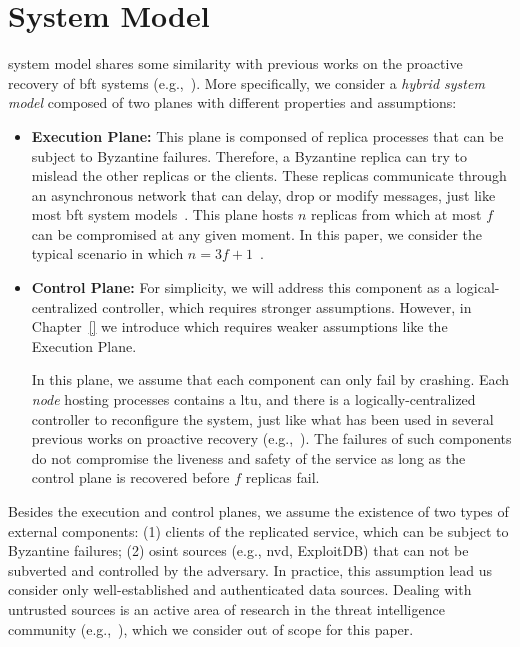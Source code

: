 \section{System Model}
\label{sec:systemmodel}

\system system model shares some similarity with previous works on the proactive recovery of \gls{bft} systems (e.g.,~\cite{Castro:2002,Platania:2014,Sousa:2010,Roeder:2010}).
More specifically, we consider a \emph{hybrid system model} composed of two planes with different properties and assumptions:

\begin{itemize}

\item \textbf{Execution Plane:} 
This plane is componsed of replica processes that can be subject to Byzantine failures.
Therefore, a Byzantine replica can try to mislead the other replicas or the clients.
These replicas communicate through an asynchronous network that can delay, drop or modify messages, just like most \gls{bft} system models~\cite{Castro:1999,Kotla:2010,Bessani:2014,Aublin:2015}.
This plane hosts $n$ replicas from which at most $f$ can be compromised at any given moment.
In this paper, we consider the typical scenario in which $n=3f+1$~\cite{Castro:2002,Kotla:2010,Aublin:2015}.  

\item \textbf{Control Plane:}  
For simplicity, we will address this component as a logical-centralized controller, which requires stronger assumptions. 
However, in Chapter~\ref{} we introduce \controller which requires weaker assumptions like the Execution Plane.

In this plane, we assume that each component can only fail by crashing. 
Each \emph{node} hosting processes contains a \gls{ltu}, and there is a logically-centralized controller to reconfigure the system, just like what has been used in several previous works on proactive recovery (e.g.,~\cite{Roeder:2010,Platania:2014,Sousa:2010}).
The failures of such components do not compromise the liveness and safety of the service as long as the control plane is recovered before $f$ replicas fail.


\end{itemize}

Besides the execution and control planes, we assume the existence of two types of external components: (1) clients of the replicated service, which can be subject to Byzantine failures; (2) \gls{osint} sources (e.g., \gls{nvd}, ExploitDB) that can not be subverted and controlled by the adversary.
In practice, this assumption lead us consider only well-established and authenticated data sources.
Dealing with untrusted sources is an active area of research in the threat intelligence community (e.g.,~\cite{Sabottke:2015,Liu:2015}), which we consider out of scope for this paper.


